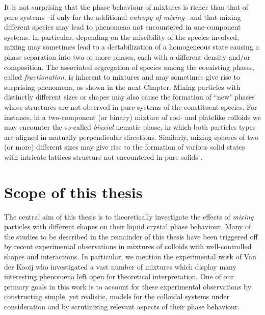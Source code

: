 \documentclass[amssymb]{revtex4}
\begin{document}
It is not surprising that the phase behaviour of  mixtures is richer than that of pure systems
--if only for the additional {\em entropy of mixing}-- and
that mixing different species may lead to  phenomena not encountered in one-component systems.
In particular, depending on the miscibility of the species involved,  mixing 
may sometimes lead to a destabilization of a homogeneous state 
causing a phase separation into two or more phases, each with a different 
density and/or composition. The associated segregation of species among the coexisting phases,
called  {\em fractionation}, is inherent to mixtures and may sometimes give rise to surprising phenomena, 
as shown in the next Chapter.
Mixing particles with distinctly different sizes or shapes
may also cause the formation of ``new" phases whose structures are not observed in pure systems 
of the constituent species. For instance, in a two-component (or binary) mixture
 of rod- and platelike colloids we may encounter the so-called {\em biaxial} nematic
phase, in which both particles types are aligned 
in mutually perpendicular directions. Similarly, mixing spheres of two (or more) different sizes
may give rise to the formation of various solid states with intricate
lattices structure  not encountered in pure solids \cite{Bartlettbinary}. 


\section{Scope of this thesis}
The central aim of this thesis is to theoretically investigate 
the effects of  {\em mixing}  particles with different shapes
on their liquid crystal phase behaviour.
Many of the studies to be described in the remainder of this thesis have been triggered off 
by recent experimental observations in mixtures of colloids with well-controlled shapes 
and interactions.
In particular, we mention the experimental work of Van der Kooij \cite{felixthesis} who investigated a vast number
of mixtures which display many interesting phenomena left open for theoretical interpretation. 
One of our primary goals in this work is to account for these 
experimental observations by constructing simple, yet realistic,  models
for the colloidal systems under consideration 
and by scrutinizing relevant aspects of their phase behaviour.
\end{document}
